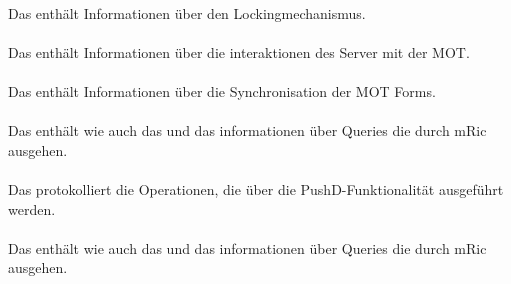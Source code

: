 \paragraph{\mlogisticsLockingLog}
Das \texttt{\mlogisticsLockingLog} enthält Informationen über den Lockingmechanismus.

\paragraph{\mlogisticsMotLog}
Das \texttt{\mlogisticsMotLog} enthält Informationen über die interaktionen des Server mit der MOT.

\paragraph{\mlogisticsMotFormsLog}
Das \texttt{\mlogisticsMotFormsLog} enthält Informationen über die Synchronisation der MOT Forms.

\paragraph{\mlogisticsMultiQueryServletLog}
Das \texttt{\mlogisticsMultiQueryServletLog} enthält wie auch das \mlogisticsQueryServletLog und das \mlogisticsQueryStreamLog informationen über Queries die durch mRic ausgehen.

\paragraph{\mlogisticsPushDLog}
Das \texttt{\mlogisticsPushDLog} protokolliert die Operationen, die über die PushD-Funktionalität ausgeführt werden.

\paragraph{\mlogisticsQueryServletLog}
Das \texttt{\mlogisticsQueryServletLog} enthält wie auch das \mlogisticsMultiQueryServletLog und das \mlogisticsMultiQueryServletLog informationen über Queries die durch mRic ausgehen.

